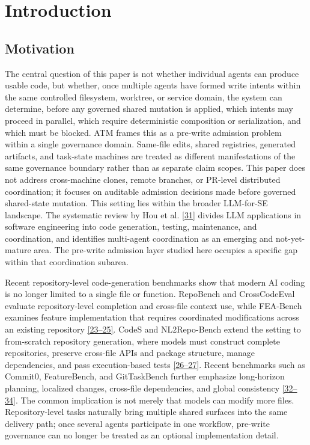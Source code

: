 \documentclass[9pt,letterpaper]{extarticle}
\begin{document}
\section{Introduction}

\subsection{Motivation}

The central question of this paper is not whether individual agents can produce usable code, but whether, once multiple agents have formed write intents within the same controlled filesystem, worktree, or service domain, the system can determine, before any governed shared mutation is applied, which intents may proceed in parallel, which require deterministic composition or serialization, and which must be blocked. ATM frames this as a pre-write admission problem within a single governance domain. Same-file edits, shared registries, generated artifacts, and task-state machines are treated as different manifestations of the same governance boundary rather than as separate claim scopes. This paper does not address cross-machine clones, remote branches, or PR-level distributed coordination; it focuses on auditable admission decisions made before governed shared-state mutation. This setting lies within the broader LLM-for-SE landscape. The systematic review by Hou et al. \textcolor{atmLinkBlue}{\hyperlink{Item.67}{[31]}} divides LLM applications in software engineering into code generation, testing, maintenance, and coordination, and identifies multi-agent coordination as an emerging and not-yet-mature area. The pre-write admission layer studied here occupies a specific gap within that coordination subarea.

Recent repository-level code-generation benchmarks show that modern AI coding is no longer limited to a single file or function. RepoBench and CrossCodeEval evaluate repository-level completion and cross-file context use, while FEA-Bench examines feature implementation that requires coordinated modifications across an existing repository \textcolor{atmLinkBlue}{\hyperlink{Item.59}{[23--25]}}. CodeS and NL2Repo-Bench extend the setting to from-scratch repository generation, where models must construct complete repositories, preserve cross-file APIs and package structure, manage dependencies, and pass execution-based tests \textcolor{atmLinkBlue}{\hyperlink{Item.62}{[26--27]}}. Recent benchmarks such as Commit0, FeatureBench, and GitTaskBench further emphasize long-horizon planning, localized changes, cross-file dependencies, and global consistency \textcolor{atmLinkBlue}{\hyperlink{Item.68}{[32--34]}}. The common implication is not merely that models can modify more files. Repository-level tasks naturally bring multiple shared surfaces into the same delivery path; once several agents participate in one workflow, pre-write governance can no longer be treated as an optional implementation detail.
\end{document}
